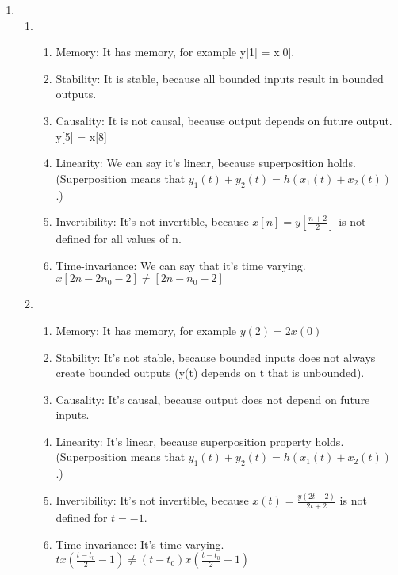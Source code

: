 \documentclass[10pt,a4paper, margin=1in]{article}
\begin{document}
\begin{enumerate}
\item %
    \begin{enumerate}
    \item
        \begin{enumerate}
        \item Memory: It has memory, for example y[1] = x[0].
        \item Stability: It is stable, because all bounded inputs result in bounded outputs.
        \item Causality: It is not causal, because output depends on future output. y[5] = x[8]
        \item Linearity: We can say it's linear, because superposition holds.\\
        (Superposition means that $y_1(t) + y_2(t) = h(x_1(t) + x_2(t))$.)
        \item Invertibility: It's not invertible, because $x[n] = y[\frac{n+2}{2}]$ is not defined for all values of n.
        \item Time-invariance: We can say that it's time varying. $x[2n-2n_0-2]\neq[2n-n_0-2]$
        \end{enumerate}
    \item 
        \begin{enumerate}
        \item Memory: It has memory, for example $y(2)=2x(0)$
        \item Stability: It's not stable, because bounded inputs does not always create bounded outputs (y(t) depends on t that is unbounded).
        \item Causality: It's causal, because output does not depend on future inputs.
        \item Linearity: It's linear, because superposition property holds.\\
        (Superposition means that $y_1(t) + y_2(t) = h(x_1(t) + x_2(t))$.)
        \item Invertibility: It's not invertible, because $x(t)=\frac{y(2t+2)}{2t+2}$ is not defined for $t = -1$.
        \item Time-invariance: It's time varying. $tx(\frac{t-t_0}{2}-1)\neq(t-t_0)x(\frac{t-t_0}{2}-1)$
        \end{enumerate}
    \end{enumerate}    

\end{enumerate}
\end{document}
